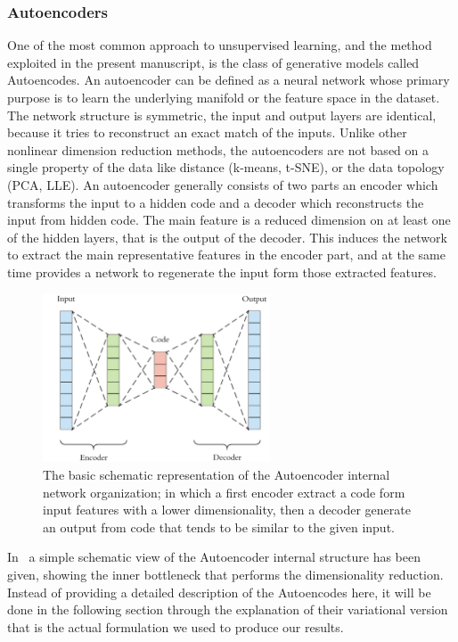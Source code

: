 \subsubsection{Autoencoders}

One of the most common approach to unsupervised learning, and the method exploited in the present manuscript, is the class of generative models called Autoencodes.
An autoencoder can be defined as a neural network whose primary purpose is to learn the underlying manifold or the feature space in the dataset. The network structure is symmetric, the input and output layers are identical, because it tries to reconstruct an exact match of the inputs. Unlike other nonlinear dimension reduction methods, the autoencoders are not based on a single property of the data like distance (k-means, t-SNE), or the data topology (PCA, LLE). An autoencoder generally consists of two parts an encoder which transforms the input to a hidden code and a decoder which reconstructs the input from hidden code. The main feature is a reduced dimension on at least one of the hidden layers, that is the output of the decoder. This induces the network to extract the main representative features in the encoder part, and at the same time provides a network to regenerate the input form those extracted features.
\begin{figure}[h]
    \centering
    \includegraphics[height=5cm]{img/3_ML/Autoencoder.png}
    \caption{The basic schematic representation of the Autoencoder internal network organization; in which a first encoder extract a code form input features with a lower dimensionality, then a decoder generate an output from code that tends to be similar to the given input. }
    \label{fig:autoencoder}
\end{figure}
In~\Figure{\ref{fig:autoencoder}} a simple schematic view of the Autoencoder internal structure has been given, showing the inner bottleneck that performs the dimensionality reduction.
Instead of providing a detailed description of the Autoencodes here, it will be done in the following section through the explanation of their variational version that is the actual formulation we used to produce our results.


